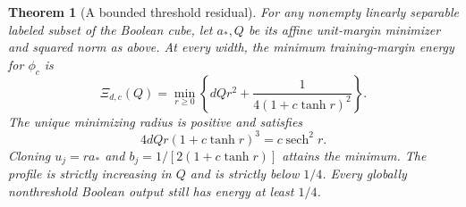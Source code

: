 \documentclass[11pt]{article}
\newtheorem{theorem}{Theorem}
\begin{document}
\begin{theorem}[A bounded threshold residual]\label{thm:bounded}
For any nonempty linearly separable labeled subset of the Boolean cube,
let $a_*,Q$ be its affine unit-margin minimizer and squared norm as above.
At every width, the minimum training-margin energy for $\phi_c$ is
\begin{equation}\label{eq:bounded-profile}
 \Xi_{d,c}(Q)=\min_{r\ge0}
       \left\{dQr^2+\frac1{4(1+c\tanh r)^2}\right\}.
\end{equation}
The unique minimizing radius is positive and satisfies
\begin{equation}\label{eq:bounded-stationary}
 4dQr(1+c\tanh r)^3=c\operatorname{sech}^2r.
\end{equation}
Cloning $u_j=r a_*$ and $b_j=1/[2(1+c\tanh r)]$ attains the minimum.
The profile is strictly increasing in $Q$ and is strictly below $1/4$.
Every globally nonthreshold Boolean output still has energy at least
$1/4$.
\end{theorem}
\end{document}
